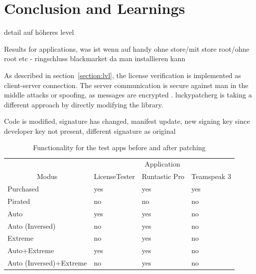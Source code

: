 \section{Conclusion and Learnings} \label{section:luckypatcher-learnings}
detail auf höheres level

Results for applications, was ist wenn auf handy ohne store/mit store root/ohne root etc - ringschluss blackmarket da man installieren kann


As described in section~\ref{section:lvl}, the license verification is implemented as client-server connection.
The server communication is secure against man in the middle attacks or spoofing, as messages are encrypted \cite{munteanLicense}.
\gls{luckypatcherg} is taking a different approach by directly modifying the library.

Code is modified, signature has changed, manifest update, new signing key since developer key not present, different signature as original\cite{codeSigning} \cite{androidSigning}

\begin{table}[h]
\centering
\begin{tabular}{llll}
                                             & \multicolumn{3}{c}{Application}             \\
\multicolumn{1}{c|}{Modus}                   & LicenseTester & Runtastic Pro & Teamspeak 3 \\ \hline
\multicolumn{1}{l|}{Purchased}               & yes           & yes           & yes         \\
\multicolumn{1}{l|}{Pirated}                 & no            & no            & no          \\
\multicolumn{1}{l|}{Auto}                    & yes           & yes           & no          \\
\multicolumn{1}{l|}{Auto (Inversed)}         & no            & yes           & no          \\
\multicolumn{1}{l|}{Extreme}                 & no            & yes           & no          \\
\multicolumn{1}{l|}{Auto+Extreme}            & yes           & yes           & no          \\
\multicolumn{1}{l|}{Auto (Inversed)+Extreme} & no            & yes           & no
\end{tabular}
\caption{Functionality for the test apps before and after patching}
\label{table:functionality}
\end{table}

